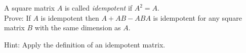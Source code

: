 
\begin{Exercise}[
name={},
title={}, 
difficulty=0,
origin={\cite{YL}}]
A square matrix $A$ is called \emph{idempotent} if $A^2=A$.\\
Prove: If $A$ is idempotent then $A+AB-ABA$ is idempotent for any square matrix $B$ with the same dimension as $A$.
\end{Exercise}

\begin{Answer}
Hint: Apply the definition of an idempotent matrix.
\end{Answer}
